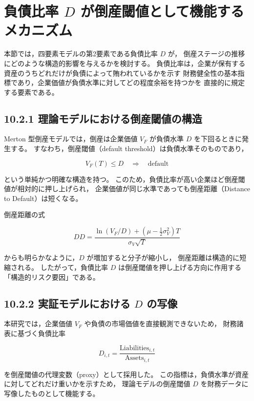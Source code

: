\section{負債比率 $D$ が倒産閾値として機能するメカニズム}

本節では，四要素モデルの第2要素である負債比率 $D$ が，
倒産ステージの推移にどのような構造的影響を与えるかを検討する。
負債比率は，企業が保有する資産のうちどれだけが負債によって賄われているかを示す
財務健全性の基本指標であり，企業価値が負債水準に対してどの程度余裕を持つかを
直接的に規定する要素である。

\subsection*{10.2.1 理論モデルにおける倒産閾値の構造}

Merton 型倒産モデルでは，倒産は企業価値 $V_F$ が負債水準 $D$ を下回るときに発生する。
すなわち，倒産閾値（default threshold）は負債水準そのものであり，



\[
V_F(T) \leq D \quad \Rightarrow \quad \text{default}
\]



という単純かつ明確な構造を持つ。
このため，負債比率が高い企業ほど倒産閾値が相対的に押し上げられ，
企業価値が同じ水準であっても倒産距離（Distance to Default）は短くなる。

倒産距離の式



\[
DD = \frac{\ln(V_F/D) + (\mu - \frac{1}{2}\sigma_V^2)T}{\sigma_V\sqrt{T}}
\]



からも明らかなように，$D$ が増加すると分子が縮小し，
倒産距離は構造的に短縮される。
したがって，負債比率 $D$ は倒産閾値を押し上げる方向に作用する
「構造的リスク要因」である。

\subsection*{10.2.2 実証モデルにおける $D$ の写像}

本研究では，企業価値 $V_F$ や負債の市場価値を直接観測できないため，
財務諸表に基づく負債比率



\[
D_{i,t} = \frac{\text{Liabilities}_{i,t}}{\text{Assets}_{i,t}}
\]



を倒産閾値の代理変数（proxy）として採用した。
この指標は，負債水準が資産に対してどれだけ重いかを示すため，
理論モデルの倒産閾値 $D$ を財務データに写像したものとして機能する。

